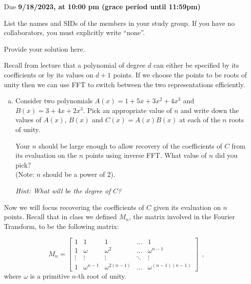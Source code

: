 \documentclass[11pt]{article}
\def\duedate{9/18/2023, at 10:00 pm (grace period until 11:59pm)}
\begin{document}
\maketitle


Due \textbf{\duedate}


List the names and SIDs of the members in your study group.
If you have no collaborators, you must explicitly write ``none''.

\begin{solution}
Provide your solution here.
\end{solution}


Recall from lecture that a polynomial of degree $d$ can either be specified by its coefficients or by its values on $d+1$ points. If we choose the points to be roots of unity then we can use  FFT to switch between the two representations efficiently.

\begin{enumerate}[(a)]
    \item  Consider two polynomials $A(x) = 1 + 5x + 3x^2 +4x^3$ and $B(x) = 3 + 4x + 2x^3$. Pick an appropriate value of $n$ and write down the values of $A(x)$, $B(x)$ and $C(x) = A(x)B(x)$ at each of the $n$ roots of unity. 
    
    Your $n$ should be large enough to allow recovery of the coefficients of $C$ from its evaluation on the $n$ points using inverse FFT. What value of $n$ did you pick? \\(Note: $n$ should be a power of 2).
    
    \emph{Hint: What will be the degree of $C$?}
\end{enumerate}

Now we will focus recovering the coefficients of $C$ given its evaluation on $n$ points. Recall that in class we defined $M_n$, the matrix involved in the Fourier Transform, to be the following matrix:

\[
M_n = 
\begin{bmatrix}
    1     & 1           & 1            & \dots  & 1 \\
    1     & \omega      & \omega^2     & \dots  & \omega^{n-1} \\
    \vdots & \vdots & \vdots & \ddots & \vdots \\
    1     & \omega^{n-1} & \omega^{2(n-1)} & \dots  & \omega^{(n-1)(n-1)}
\end{bmatrix} \enspace,
\]
where $\omega$ is a primitive $n$-th root of unity.
\end{document}
